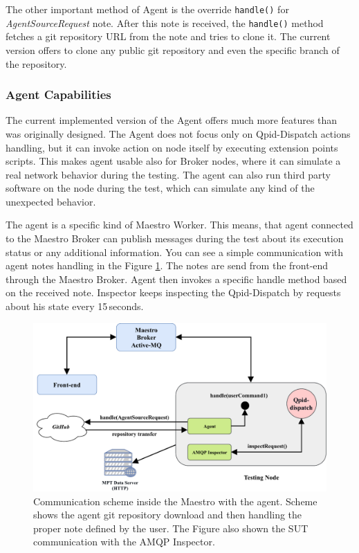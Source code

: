 The other important method of Agent is the override \texttt{handle()} for \emph{AgentSourceRequest} note. After this note is received, the \texttt{handle()} method fetches a git repository URL from the note and tries to clone it. The current version offers to clone any public git repository and even the specific branch of the repository.

\subsubsection*{Agent Capabilities}
\label{Agent Capabilities}
The current implemented version of the Agent offers much more features than was originally designed. The Agent does not focus only on Qpid-Dispatch actions handling, but it can invoke action on node itself by executing extension points scripts. This makes agent usable also for Broker nodes, where it can simulate a real network behavior during the testing. The agent can also run third party software on the node during the test, which can simulate any kind of  the unexpected behavior.

The agent is a specific kind of Maestro Worker. This means, that agent connected to the Maestro Broker can publish messages during the test about its execution status or any additional information. You can see a simple communication with agent notes handling in the Figure \ref{fig:agent_demo}. The notes are send from the front-end through the Maestro Broker. Agent then invokes a specific handle method based on the received note. Inspector keeps inspecting the Qpid-Dispatch by requests about his state every 15\,seconds.

\begin{figure}[H]
  \centering
  \includegraphics[width=15cm]{obrazky-figures/agent_demo.pdf}
  \caption{Communication scheme inside the Maestro with the agent. Scheme shows the agent git repository download and then handling the proper note defined by the user. The Figure also shown the SUT communication with the AMQP Inspector.}
  \label{fig:agent_demo}
\end{figure}

